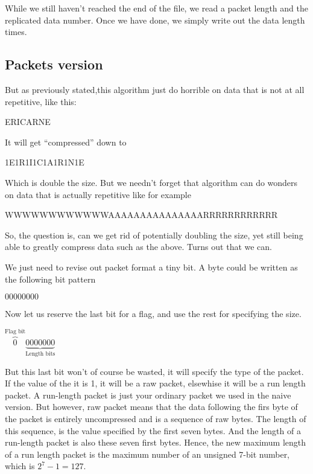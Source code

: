 \begin{refsection}
While we still haven't reached the end of the file, we read a packet
length and the replicated data number. Once we have done, we simply
write out the data length times.

\subsection{Packets version}
\label{sec:packets-version}

But as previously stated,this algorithm just do horrible on data that
is not at all repetitive, like this:

\begin{indentpar}
  ERICARNE
\end{indentpar}

It will get ``compressed'' down to

\begin{indentpar}
  1E1R1I1C1A1R1N1E
\end{indentpar}

Which is double the size. But we needn't forget that algorithm can
do wonders on data that is actually repetitive like for example

\begin{indentpar}
  WWWWWWWWWWWWAAAAAAAAAAAAAAARRRRRRRRRRRR
\end{indentpar}

So, the question is, can we get rid of potentially doubling the size,
yet still being able to greatly compress data such as the
above. Turns out that we can.

We just need to revise out packet format a tiny bit. A byte could be
written as the following bit pattern

\begin{indentpar}
  $00000000$
\end{indentpar}

Now let us reserve the last bit for a flag, and use the rest
for specifying the size.

\begin{indentpar}
  $\overbrace{0}^ \text{Flag bit}\underbrace{0000000}_ \text{Length bits}$
\end{indentpar}

But this last bit won't of course be wasted, it will specify the type
of the packet. If the value of the it is 1, it will be a raw packet,
elsewhise it will be a run length packet. A run-length packet is just
your ordinary packet we used in the naive version. But however, raw
packet means that the data following the firs byte of the packet is
entirely uncompressed and is a sequence of raw bytes. The length of
this sequence, is the value specified by the first seven bytes. And
the length of a run-length packet is also these seven first
bytes. Hence, the new maximum length of a run length packet is the
maximum number of an unsigned 7-bit number, which is $2^7 -1 = 127$.


\end{refsection}
